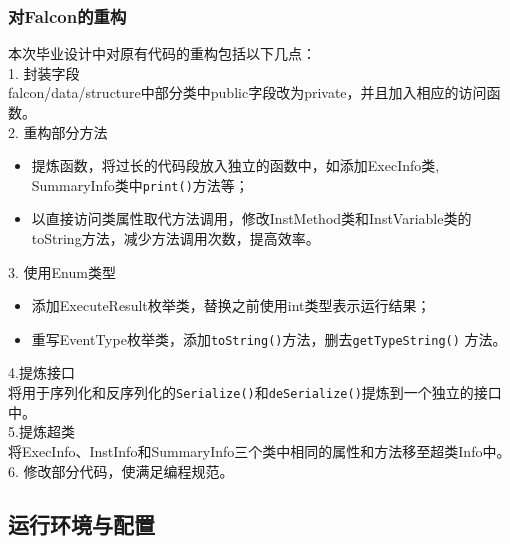 \subsubsection{对Falcon的重构}
本次毕业设计中对原有代码的重构包括以下几点：\\
1. 封装字段\\
falcon/data/structure中部分类中public字段改为private，并且加入相应的访问函数。\\
2. 重构部分方法
\begin{itemize}
  \item 提炼函数，将过长的代码段放入独立的函数中，如添加ExecInfo类, SummaryInfo类中\texttt{print()}方法等；
  \item 以直接访问类属性取代方法调用，修改InstMethod类和InstVariable类的toString方法，减少方法调用次数，提高效率。
\end{itemize}
3. 使用Enum类型
\begin{itemize}
  \item 添加ExecuteResult枚举类，替换之前使用int类型表示运行结果；
  \item 重写EventType枚举类，添加\texttt{toString()}方法，删去\texttt{getTypeString()} 方法。
\end{itemize}
4.提炼接口\\
将用于序列化和反序列化的\texttt{Serialize()}和\texttt{deSerialize()}提炼到一个独立的接口中。\\
5.提炼超类\\
将ExecInfo、InstInfo和SummaryInfo三个类中相同的属性和方法移至超类Info中。\\
6. 修改部分代码，使满足编程规范。
\subsection{运行环境与配置}
